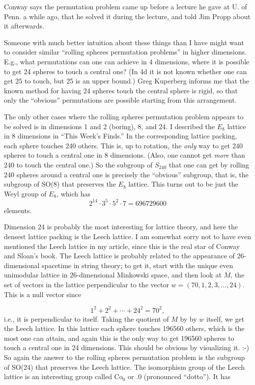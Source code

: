 Conway says the permutation problem came up before a lecture he gave at U. of Penn. a while ago, that he solved it during the lecture, and told Jim Propp about it afterwards.

Someone with much better intuition about these things than I have might want to consider similar ``rolling spheres permutation problems'' in higher dimensions. E.g., what permutations can one can achieve in 4 dimensions, where it is possible to get 24 spheres to touch a central one? (In 4d it is not known whether one can get 25 to touch, but 25 is an upper bound.) Greg Kuperberg informs me that the known method for having 24 spheres touch the central sphere is rigid, so that only the ``obvious'' permutations are possible starting from this arrangement.

The only other cases where the rolling spheres permutation problem appears to be solved is in dimensions 1 and 2 (boring), 8, and 24. I described the $E_8$ lattice in 8 dimensions in ``This Week's Finds.'' In the corresponding lattice packing, each sphere touches 240 others. This is, up to rotation, the \emph{only} way to get 240 spheres to touch a central one in 8 dimensions. (Also, one cannot get \emph{more} than 240 to touch the central one.) So the subgroup of $S_{240}$ that one can get by rolling 240 spheres around a central one is precisely the ``obvious'' subgroup, that is, the subgroup of SO(8) that preserves the $E_8$ lattice. This turns out to be just the Weyl group of $E_8$, which has
\[2^{14} \cdot 3^5 \cdot 5^2 \cdot 7 = 696729600\]
elements.

Dimension 24 is probably the most interesting for lattice theory, and here the densest lattice packing is the Leech lattice. I am somewhat sorry not to have even mentioned the Leech lattice in my article, since this is the real star of Conway and Sloan's book. The Leech lattice is probably related to the appearance of 26-dimensional spacetime in string theory; to get it, start with the unique even unimodular lattice in 26-dimensional Minkowski space, and then look at $M$, the set of vectors in the lattice perpendicular to the vector $w = (70,1,2,3,\dotsc,24)$. This is a null vector since

\[1^2 + 2^2 + \dotsb + 24^2 = 70^2,\]
%
i.e., it is perpendicular to itself. Taking the quotient of $M$ by by $w$ itself, we get the Leech lattice. In this lattice each sphere touches 196560 others, which is the most one can attain, and again this is the only way to get 196560 spheres to touch a central one in 24 dimensions. This should be obvious by visualizing it. :-) So again the answer to the rolling spheres permutation problem is the subgroup of SO(24) that preserves the Leech lattice. The isomorphism group of the Leech lattice is an interesting group called Co${}_0$ or .0 (pronounced ``dotto''). It has


